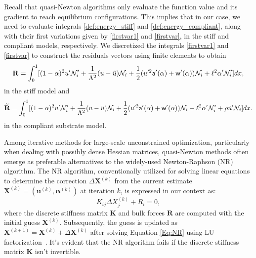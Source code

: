 Recall that quasi-Newton algorithms only evaluate the function value and its gradient to reach equilibrium configurations. This implies that in our case, we need to evaluate integrals \eqref{def:energy_stiff} and \eqref{def:energy_compliant}, along with their first variations given by \eqref{firstvar1} and \eqref{firstvar}, in the stiff and compliant models, respectively. We   discretized the integrals \eqref{firstvar1} and \eqref{firstvar} to construct the residuals vectors using finite elements to obtain 
\begin{equation}
    {\bf R} =
     \int_0^1 [(1-\alpha)^2u'\mathcal{N}'_i+\frac{1}{\Lambda^2} (u-\tilde u) \mathcal{N}_i+\frac{1}{2}(u'^2 \mathsf{a}'(\alpha)+\mathsf{w}'(\alpha))\mathcal{N}_i+\ell^2\alpha'\mathcal{N}'_i ]dx,\label{residual1}
\end{equation}
in the stiff model and 
\begin{equation}
    \widetilde{{\bf R}}= 
    \int_0^1 [(1-\alpha)^2u'\mathcal{N}'_i+\frac{1}{\Lambda^2} (u-\tilde u) \mathcal{N}_i+\frac{1}{2}(u'^2 \mathsf{a}'(\alpha)+\mathsf{w}'(\alpha))\mathcal{N}_i+\ell^2\alpha'\mathcal{N}'_i +
    \rho \tilde u'\mathcal{N}_i]dx\label{residual2}.
\end{equation}
in the compliant substrate model. 

Among iterative methods for large-scale unconstrained optimization, particularly when dealing with possibly dense Hessian matrices,  quasi-Newton methods often emerge as preferable alternatives to the widely-used Newton-Raphson (NR) algorithm. The NR algorithm, conventionally utilized for solving linear equations to determine the correction $\Delta \mathbf{X}^{(k)}$ from the current estimate $\mathbf{X}^{(k)} = (\mathbf{u}^{(k)}, \boldsymbol{\alpha}^{(k)})$ at iteration $k$, is expressed in our context as:
\begin{equation}
K_{ij} \Delta X_j^{(k)} + R_i = 0,
\label{Eq:NR}
\end{equation}
where the discrete stiffness matrix $\mathbf{K}$ and bulk forces $\mathbf{R}$ are computed with the initial guess $\mathbf{X}^{(k)}$. Subsequently, the guess is updated as $\mathbf{X}^{(k+1)} = \mathbf{X}^{(k)} + \Delta \mathbf{X}^{(k)}$ after solving Equation \eqref{Eq:NR} using LU factorization~\cite{Sanderson2016-ht}. It's evident that the NR algorithm fails if the discrete stiffness matrix $\mathbf{K}$ isn't invertible.

